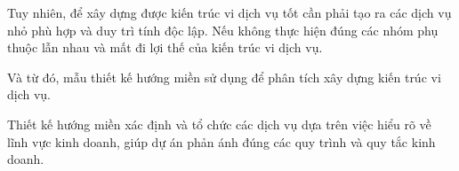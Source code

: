 

Tuy nhiên, để xây dựng được kiến trúc vi dịch vụ tốt cần phải tạo ra các dịch vụ nhỏ phù hợp và duy trì tính độc lập. Nếu không thực hiện đúng các nhóm phụ thuộc lẫn nhau và mất đi lợi thế của kiến trúc vi dịch vụ.

Và từ đó, mẫu thiết kế hướng miền sử dụng để phân tích xây dựng kiến trúc vi dịch vụ.

Thiết kế hướng miền xác định và tổ chức các dịch vụ dựa trên việc hiểu rõ về lĩnh vực kinh doanh, giúp dự án phản ánh đúng các quy trình và quy tắc kinh doanh.










